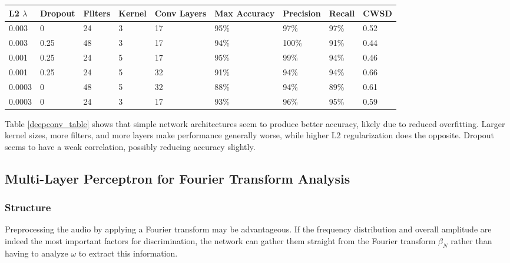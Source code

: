 \documentclass[10pt]{article}
\begin{document}
\begin{minipage}{\textwidth}
    \begin{center}
         \label{deepconv_table} 
        \begin{tabular}{|l|l|l|l|l|l|l|l|l|}
            \hline
            L2 $\lambda$ & Dropout & Filters & Kernel & Conv Layers & Max Accuracy & Precision & Recall & CWSD \\
            \hline
            0.003 & 0 & 24 & 3 & 17 & 95\% & 97\% & 97\% & 0.52 \\
            \hline
            0.003 & 0.25 & 48 & 3 & 17 & 94\% & 100\% & 91\% & 0.44 \\
            \hline
            0.001 & 0.25 & 24 & 5 & 17 & 95\% & 99\% & 94\% & 0.46 \\
            \hline
            0.001 & 0.25 & 24 & 5 & 32 & 91\% & 94\% & 94\% & 0.66 \\
            \hline
            0.0003 & 0 & 48 & 5 & 32 & 88\% & 94\% & 89\% & 0.61 \\
            \hline
            0.0003 & 0 & 24 & 3 & 17 & 93\% & 96\% & 95\% & 0.59 \\
            \hline
        \end{tabular}
    \end{center}
\end{minipage}

Table \ref{deepconv_table} shows that simple network architectures seem to produce better accuracy, likely due to reduced overfitting. Larger kernel sizes, more filters, and more layers make performance generally worse, while higher L2 regularization does the opposite. Dropout seems to have a weak correlation, possibly reducing accuracy slightly.

\subsection{Multi-Layer Perceptron for Fourier Transform Analysis} \label{mlp}

\subsubsection{Structure}

Preprocessing the audio by applying a Fourier transform may be advantageous. If the frequency distribution and overall amplitude are indeed the most important factors for discrimination, the network can gather them straight from the Fourier transform $\beta_{N}$ rather than having to analyze $\omega$ to extract this information.
\end{document}
